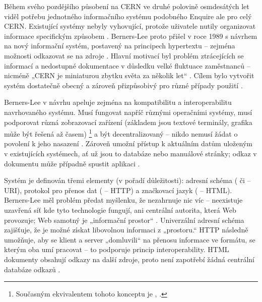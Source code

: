 Během svého pozdějšího působení na CERN ve druhé polovině osmdesátých let viděl potřebu jednotného informačního systému podobného Enquire ale pro celý CERN. Existující systémy nebyly vyhovující, protože uživatele nutily organizovat informace specifickým způsobem \autocite[15]{Berners-Lee1999}. Berners-Lee proto přišel v roce 1989 s návrhem na nový informační systém, postavený na principech hypertextu -- zejména možnosti odkazovat se na zdroje \autocite{Berners-Lee1989}. Hlavní motivací byl problém ztrácejících se informací a nedostupné dokumentace v důsledku velké fluktuace zaměstnanců -- nicméně „CERN je miniaturou zbytku světa za několik let“ \autocite[\pno~]{Berners-Lee1989}.
Cílem bylo vytvořit systém dostatečně obecný a zároveň přizpůsobivý pro různé případy použití \autocite[20]{Berners-Lee1999}.

\label{p:web:compat}
Berners-Lee v návrhu apeluje zejména na kompatibilitu a interoperabilitu navrhovaného systému. Musí fungovat napříč různými operačními systémy, musí podporovat různá zobrazovací zařízení (základem jsou textové terminály, grafika může být řešená až časem)%
\footnote{Současným ekvivalentem tohoto konceptu je , \textcite[viz][]{Gustafson2008}.} %
a být decentralizovaný -- nikdo nemusí žádat o povolení k jeho nasazení \autocites[\pno~]{Berners-Lee1989}[16]{Berners-Lee1999}. Zároveň umožní přístup k aktuálním datům uloženým v existujících systémech, ať už jsou to databáze nebo manuálové stránky; odkaz v dokumentu může případně spustit  aplikaci \autocite[\pno~]{Berners-Lee1989}.

Systém  je definován třemi elementy (v pořadí důležitosti): adresní schéma ( či  -- URI), protokol pro přenos dat ( -- HTTP) a značkovací jazyk ( -- HTML). Berners-Lee měl problém předat myšlenku, že  nezahrnuje nic víc -- neexistuje uzavřená síť kde tyto technologie fungují, ani centrální autorita, která Web provozuje; Web samotný je „informační prostor“ \autocite[36]{Berners-Lee1999}. Univerzální adresní schéma zajišťuje, že je možné získat libovolnou informaci z „prostoru.“ HTTP následně umožňuje, aby se klient a server „domluvili“ na přenosu informace ve formátu, se kterým oba umí pracovat \autocite[36--37]{Berners-Lee1999} -- to podporuje princip interoperability. HTML dokumenty obsahují odkazy na další zdroje, proto není zapotřebí žádná centrální databáze odkazů \autocite[16]{Berners-Lee1999}.

